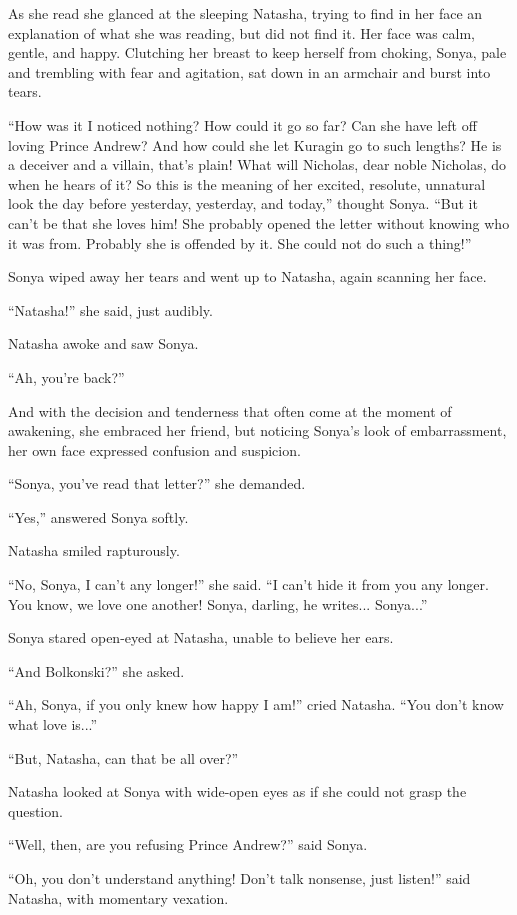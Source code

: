 As she read she glanced at the sleeping Natasha, trying to find
in her face an explanation of what she was reading, but did not
find it. Her face was calm, gentle, and happy. Clutching her
breast to keep herself from choking, Sonya, pale and trembling
with fear and agitation, sat down in an armchair and burst into
tears.

``How was it I noticed nothing? How could it go so far? Can she
have left off loving Prince Andrew? And how could she let Kuragin
go to such lengths? He is a deceiver and a villain, that's plain!
What will Nicholas, dear noble Nicholas, do when he hears of it?
So this is the meaning of her excited, resolute, unnatural look
the day before yesterday, yesterday, and today,'' thought
Sonya. ``But it can't be that she loves him! She probably opened
the letter without knowing who it was from. Probably she is
offended by it. She could not do such a thing!''

Sonya wiped away her tears and went up to Natasha, again scanning
her face.

``Natasha!'' she said, just audibly.

Natasha awoke and saw Sonya.

``Ah, you're back?''

And with the decision and tenderness that often come at the
moment of awakening, she embraced her friend, but noticing
Sonya's look of embarrassment, her own face expressed confusion
and suspicion.

``Sonya, you've read that letter?'' she demanded.

``Yes,'' answered Sonya softly.

Natasha smiled rapturously.

``No, Sonya, I can't any longer!'' she said. ``I can't hide it
from you any longer. You know, we love one another! Sonya,
darling, he writes...  Sonya...''

Sonya stared open-eyed at Natasha, unable to believe her ears.

``And Bolkonski?'' she asked.

``Ah, Sonya, if you only knew how happy I am!'' cried
Natasha. ``You don't know what love is...''

``But, Natasha, can that be all over?''

Natasha looked at Sonya with wide-open eyes as if she could not
grasp the question.

``Well, then, are you refusing Prince Andrew?'' said Sonya.

``Oh, you don't understand anything! Don't talk nonsense, just
listen!''  said Natasha, with momentary vexation.

